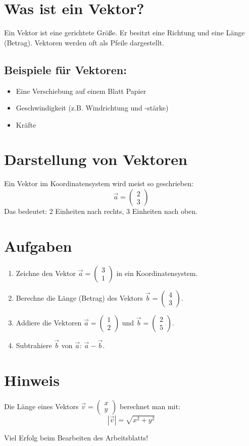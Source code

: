 
\section*{Was ist ein Vektor?}
Ein Vektor ist eine gerichtete Größe. Er besitzt eine Richtung und eine Länge (Betrag). Vektoren werden oft als Pfeile dargestellt.

\subsection*{Beispiele für Vektoren:}
\begin{itemize}
  \item Eine Verschiebung auf einem Blatt Papier
  \item Geschwindigkeit (z.B. Windrichtung und -stärke)
  \item Kräfte
\end{itemize}

\section*{Darstellung von Vektoren}
Ein Vektor im Koordinatensystem wird meist so geschrieben:
\[
\vec{a} = \begin{pmatrix} 2 \\ 3 \end{pmatrix}
\]
Das bedeutet: 2 Einheiten nach rechts, 3 Einheiten nach oben.

\section*{Aufgaben}
\begin{enumerate}
  \item Zeichne den Vektor $\vec{a} = \begin{pmatrix} 3 \\ 1 \end{pmatrix}$ in ein Koordinatensystem.
  \item Berechne die Länge (Betrag) des Vektors $\vec{b} = \begin{pmatrix} 4 \\ 3 \end{pmatrix}$.
  \item Addiere die Vektoren $\vec{a} = \begin{pmatrix} 1 \\ 2 \end{pmatrix}$ und $\vec{b} = \begin{pmatrix} 2 \\ 5 \end{pmatrix}$.
  \item Subtrahiere $\vec{b}$ von $\vec{a}$: $\vec{a} - \vec{b}$.
\end{enumerate}

\section*{Hinweis}
Die Länge eines Vektors $\vec{v} = \begin{pmatrix} x \\ y \end{pmatrix}$ berechnet man mit:
\[
|\vec{v}| = \sqrt{x^2 + y^2}
\]

Viel Erfolg beim Bearbeiten des Arbeitsblatts!